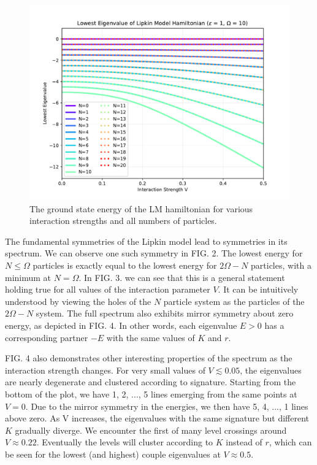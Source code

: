 \documentclass[prb,aps,twocolumn,showpacs,10pt]{revtex4-2}
\begin{document}
\begin{figure}
  \includegraphics[width=\linewidth]{../figures/plot_lipkin_gs_V_N.pdf}
  \caption{The ground state energy of the LM hamiltonian for various interaction strengths and all numbers of particles.}
\end{figure}

The fundamental symmetries of the Lipkin model lead to symmetries in its spectrum. We can observe one such symmetry in FIG. 2. The lowest energy for $N\leq \Omega$ particles is exactly equal to the lowest energy for $2\Omega-N$ particles, with a minimum at $N=\Omega$. In FIG. 3. we can see that this is a general statement holding true for all values of the interaction parameter $V$. It can be intuitively understood by viewing the holes of the $N$ particle system as the particles of the $2\Omega-N$ system. The full spectrum also exhibits mirror symmetry about zero energy, as depicted in FIG. 4. In other words, each eigenvalue $E > 0$  has a corresponding partner $-E$ with the same values of $K$ and $r$. 

FIG. 4 also demonstrates other interesting properties of the spectrum as the interaction strength changes. For very small values of $V \lesssim 0.05$, the eigenvalues are nearly degenerate and clustered according to signature. Starting from the bottom of the plot, we have 1, 2, ..., 5 lines emerging from the same points at $V=0$. Due to the mirror symmetry in the energies, we then have 5, 4, ..., 1 lines above zero. As V increases, the eigenvalues with the same signature but different $K$ gradually diverge. We encounter the first of many level crossings around $V \approx 0.22$. Eventually the levels will cluster according to $K$ instead of $r$, which can be seen for the lowest (and highest) couple eigenvalues at $V \approx 0.5$. 
\end{document}
